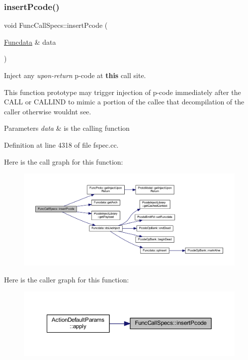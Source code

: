 \subsubsection{\texorpdfstring{insertPcode()}{insertPcode()}}
{\footnotesize\ttfamily void Func\+Call\+Specs\+::insert\+Pcode (\begin{DoxyParamCaption}\item[{\mbox{\hyperlink{class_funcdata}{Funcdata}} \&}]{data }\end{DoxyParamCaption})}



Inject any {\itshape upon-\/return} p-\/code at {\bfseries{this}} call site. 

This function prototype may trigger injection of p-\/code immediately after the C\+A\+LL or C\+A\+L\+L\+I\+ND to mimic a portion of the callee that decompilation of the caller otherwise wouldn\textquotesingle{}t see. 
\begin{DoxyParams}{Parameters}
{\em data} & is the calling function \\
\hline
\end{DoxyParams}


Definition at line 4318 of file fspec.\+cc.

Here is the call graph for this function\+:
\nopagebreak
\begin{figure}[H]
\begin{center}
\leavevmode
\includegraphics[width=350pt]{class_func_call_specs_aae6a890aaa82deca59ec7c57c92629aa_cgraph}
\end{center}
\end{figure}
Here is the caller graph for this function\+:
\nopagebreak
\begin{figure}[H]
\begin{center}
\leavevmode
\includegraphics[width=350pt]{class_func_call_specs_aae6a890aaa82deca59ec7c57c92629aa_icgraph}
\end{center}
\end{figure}
\mbox{\label{class_func_call_specs_ae9f1afc18ffb30d43e25b0065823f366}} 
